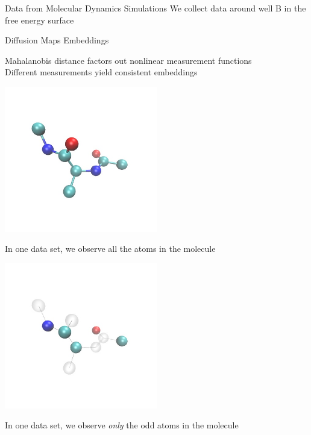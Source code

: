 \documentclass[12pt]{beamer}
\begin{document}
\begin{frame}{Data from Molecular Dynamics Simulations}
    \vspace{0.1in}
    We collect data around well B in the free energy surface

\end{frame}

\begin{frame}{Diffusion Maps Embeddings}

	{\small
	Mahalanobis distance factors out nonlinear measurement functions \\
	Different measurements yield consistent embeddings
	\par}
	
    \begin{minipage}[t]{0.45\textwidth}
        \centering
        \includegraphics[width=0.5\textwidth, trim=0in 0.2in 0in 0.2in, clip]{molecule_all}\\
        {\scriptsize In one data set, we observe all the atoms in the molecule \par}
    \end{minipage}
    \hfill
    \begin{minipage}[t]{0.45\textwidth}
        \centering
        \includegraphics[width=0.5\textwidth, trim=0in 0.2in 0in 0.2in, clip]{molecule_odd}\\
        {\scriptsize In one data set, we observe {\em only} the odd atoms in the molecule \par}
    \end{minipage}


\end{frame}
\end{document}
